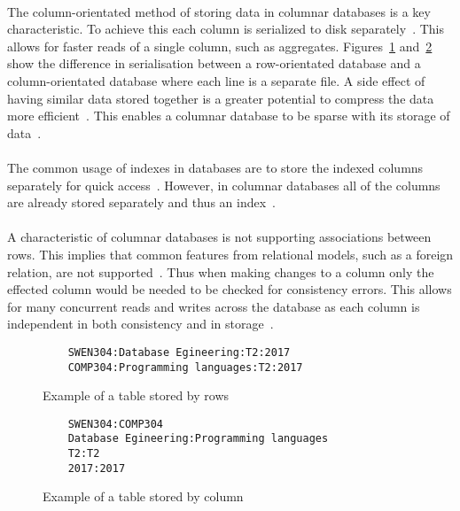 \documentclass{CRPITStyle}
\renewcommand{\cite}{\citep}
\begin{document}
\paragraph{}
The column-orientated method of storing data in columnar databases is a 
key characteristic.
To achieve this each column is serialized to disk
separately~\cite{bigtable,nosql_survey}.
This allows for faster reads of a single column, such as aggregates.
Figures~\ref{lst:row} and~\ref{lst:column} show the difference in serialisation
between a row-orientated database and a column-orientated database where each
line is a separate file.
A side effect of having similar data stored together is a greater potential to
compress the data more efficient~\cite{nosql_survey}.
This enables a columnar database to be sparse with its storage of data~\cite{bigtable}.

\paragraph{}
The common usage of indexes in databases are to store the indexed columns
separately for quick access~\cite{relational_db}.
However, in columnar databases all of the columns are already stored
separately and thus an index~\cite{nosql_survey}.

\paragraph{}
A characteristic of columnar databases is not supporting associations between
rows.
This implies that common features from relational models, such as a foreign relation, 
are not supported~\cite{relational_db,nosql_survey}.
Thus when making changes to a column only the effected column would be needed
to be checked for consistency errors.
This allows for many concurrent reads and writes across the database as each
column is independent in both consistency and in storage~\cite{nosql_survey}.


\begin{figure}
\begin{verbatim}
    SWEN304:Database Egineering:T2:2017
    COMP304:Programming languages:T2:2017
\end{verbatim}
\caption{Example of a table stored by rows}
\label{lst:row}
\end{figure}

\begin{figure}
\begin{verbatim}
    SWEN304:COMP304
    Database Egineering:Programming languages
    T2:T2
    2017:2017
\end{verbatim}
\caption{Example of a table stored by column}
\label{lst:column}
\end{figure}
\end{document}
